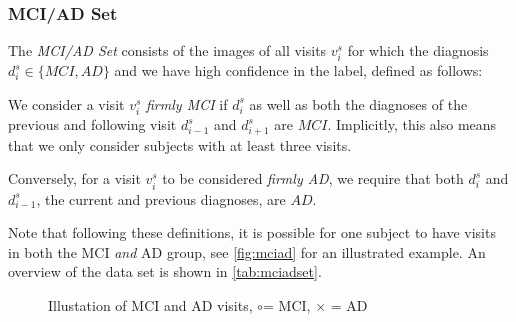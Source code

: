 \subsubsection*{MCI/AD Set} \label{sec:datmciad}
The \textit{MCI/AD Set} consists of the images of all visits $v^s_i$ for which the diagnosis $d^s_i \in \{MCI, AD\}$ and we have high confidence in the label, defined as follows:

We consider a visit $v^s_i$ \textit{firmly MCI} if $d^s_i$ as well as both the diagnoses of the previous and following visit $d^s_{i-1}$ and $d^s_{i+1}$ are $MCI$. Implicitly, this also means that we only consider subjects with at least three visits.

Conversely, for a visit $v^s_i$ to be considered \textit{firmly AD}, we require that both $d^s_i$ and $d^s_{i-1}$, the current and previous diagnoses, are $AD$.

Note that following these definitions, it is possible for one subject to have visits in both the MCI \textit{and} AD group, see \autoref{fig:mciad} for an illustrated example. An overview of the data set is shown in \autoref{tab:mciadset}.

\begin{figure}[h]
	\centering
	
	\caption{Illustation of MCI and AD visits, \Large$\circ$\normalsize\;= MCI, $\times$ = AD}
	\label{fig:mciad}
\end{figure}

\vspace{20pt}

